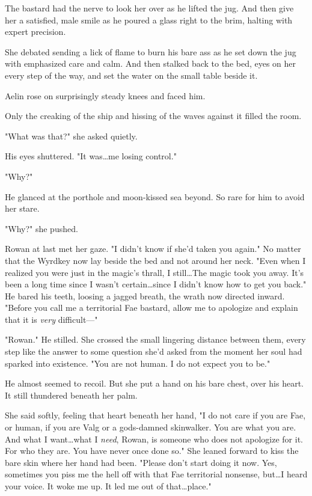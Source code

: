 The bastard had the nerve to look her over as he lifted the jug.
And then give her a satisfied, male smile as he poured a glass right to the brim, halting with expert precision.

She debated sending a lick of flame to burn his bare ass as he set down the jug with emphasized care and calm.
And then stalked back to the bed, eyes on her every step of the way, and set the water on the small table beside it.

Aelin rose on surprisingly steady knees and faced him.

Only the creaking of the ship and hissing of the waves against it filled the room.

"What was that?"
she asked quietly.

His eyes shuttered.
"It was\ldots me losing control."

"Why?"

He glanced at the porthole and moon-kissed sea beyond.
So rare for him to avoid her stare.

"Why?"
she pushed.

Rowan at last met her gaze.
"I didn't know if she'd taken you again."
No matter that the Wyrdkey now lay beside the bed and not around her neck.
"Even when I realized you were just in the magic's thrall, I still\ldots The magic took you away.
It's been a long time since I wasn't certain\ldots since I didn't know how to get you back."
He bared his teeth, loosing a jagged breath, the wrath now directed inward.
"Before you call me a territorial Fae bastard, allow me to apologize and explain that it is \emph{very} difficult---"

"Rowan."
He stilled.
She crossed the small lingering distance between them, every step like the answer to some question she'd asked from the moment her soul had sparked into existence.
"You are not human.
I do not expect you to be."

He almost seemed to recoil.
But she put a hand on his bare chest, over his heart.
It still thundered beneath her palm.

She said softly, feeling that heart beneath her hand, "I do not care if you are Fae, or human, if you are Valg or a gods-damned skinwalker.
You are what you are.
And what I want\ldots what I \emph{need}, Rowan, is someone who does not apologize for it.
For who they are.
You have never once done so."
She leaned forward to kiss the bare skin where her hand had been.
"Please don't start doing it now.
Yes, sometimes you piss me the hell off with that Fae territorial nonsense, but\ldots I heard your voice.
It woke me up.
It led me out of that\ldots place."

